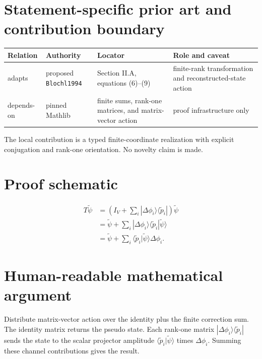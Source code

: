 \section{Statement-specific prior art and contribution boundary}
\begin{tabularx}{\textwidth}{@{}lYYY@{}}
\toprule
Relation & Authority & Locator & Role and caveat \\
\midrule
adapts & proposed \texttt{Blochl1994} & Section II.A, equations (6)--(9) & finite-rank transformation and reconstructed-state action \\
depends-on & pinned Mathlib & finite sums, rank-one matrices, and matrix-vector action & proof infrastructure only \\
\bottomrule
\end{tabularx}
The local contribution is a typed finite-coordinate realization with explicit conjugation and
rank-one orientation.  No novelty claim is made.

\section{Proof schematic}
\[
\begin{aligned}
 T\widetilde\psi
 &=\left(I_V+\sum_i|\Delta\phi_i\rangle\langle\widetilde p_i|\right)
   \widetilde\psi\\
 &=\widetilde\psi+
   \sum_i |\Delta\phi_i\rangle
   \langle\widetilde p_i|\widetilde\psi\rangle\\
 &=\widetilde\psi+
   \sum_i\langle\widetilde p_i|\widetilde\psi\rangle\Delta\phi_i.
\end{aligned}
\]

\section{Human-readable mathematical argument}
Distribute matrix-vector action over the identity plus the finite correction sum.  The identity
matrix returns the pseudo state.  Each rank-one matrix
$|\Delta\phi_i\rangle\langle\widetilde p_i|$ sends the state to the scalar projector amplitude
$\langle\widetilde p_i|\widetilde\psi\rangle$ times $\Delta\phi_i$.  Summing these channel
contributions gives the result.

